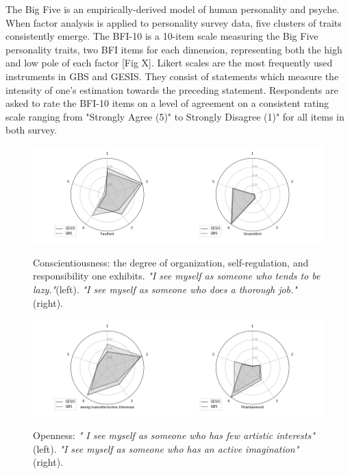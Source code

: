 The Big Five is an empirically-derived model of human personality and psyche. When factor analysis is applied to personality survey data, five clusters of traits consistently emerge. The BFI-10 is a 10-item scale measuring the Big Five personality traits, two BFI items for each dimension, representing both the high and low pole of each factor [Fig X]. Likert scales are the most frequently used instruments in GBS and GESIS. They consist of statements which measure the intensity of one's estimation towards the preceding statement. Respondents are asked to rate the BFI-10 items on a level of agreement on a consistent rating scale ranging from "Strongly Agree (5)" to Strongly Disagree (1)" for all items in both survey.

\begin{figure}[ht]
	\begin{center}
		\includegraphics[scale=0.55,angle=0]{fig/Conscientiousness_figure}
		\label{Conscientiousness}
		\caption{Conscientiousness: the degree of organization, self-regulation, and responsibility one exhibits. \textit{"I see myself as someone who tends to be lazy."}(left). \textit{"I see myself as someone who does a thorough job."}(right).}
	\end{center}
\end{figure}

                \begin{figure}[ht]
                \begin{center}
                   \includegraphics[scale=0.55,angle=0]{fig/Opennessfigure}
	         \label{Openness}
	         \caption{ Openness: \textit{" I see myself as someone who has few artistic interests"}(left). \textit{"I see myself as someone who has an active imagination"}(right).}
                \end{center}
                \end{figure}

